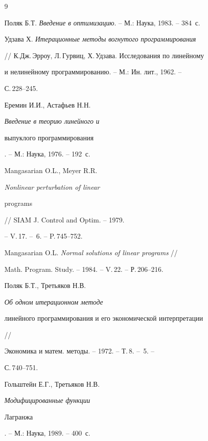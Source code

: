 \begin{thebibliography}{9}







Поляк Б.Т. {\em Введение в оптимизацию}. -- М.: Наука, 1983. -- 384~с.




Удзава Х. {\em Итерационные методы вогнутого программирования}


// К.Дж.\,Эрроу, Л.\,Гурвиц, Х.\,Удзава. Исследования по линейному


и нелинейному программированию. -- М.: Ин. лит., 1962. --


С.\,228--245.




Еремин И.И., Астафьев Н.Н. {\em Введение в теорию линейного и


выпуклого программирования}. -- М.: Наука, 1976. -- 192~с.




Mangasarian O.L., Meyer R.R. {\em Nonlinear perturbation of linear


programs} // SIAM J. Control and Optim. -- 1979.


-- V.\,17. -- \No\,6. -- P.\,745--752.




Mangasarian O.L. {\em Normal solutions of linear programs} //


Math. Program. Study. -- 1984. -- V.\,22. -- Р.\,206--216.




Поляк Б.Т., Третьяков Н.В. {\em Об одном итерационном методе


линейного программирования и его экономической интерпретации} //


Экономика и матем. методы. -- 1972. -- Т.\,8. -- \No\,5. --


С.\,740--751.




Гольштейн Е.Г., Третьяков Н.В. {\em Модифицированные функции


Лагранжа}. -- М.: Наука, 1989. -- 400~с.


\end{thebibliography}





\vskip 2cm















